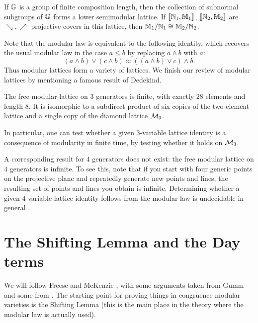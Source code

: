 \begin{appendices}
\begin{prop} If $\mathbb{G}$ is a group of finite composition length, then the collection of subnormal subgroups of $\mathbb{G}$ forms a lower semimodular lattice. If $\llbracket \mathbb{N}_1, \mathbb{M}_1 \rrbracket$, $\llbracket \mathbb{N}_2, \mathbb{M}_2 \rrbracket$ are $\searrow, \nearrow$ projective covers in this lattice, then $\mathbb{M}_1/\mathbb{N}_1 \cong \mathbb{M}_2/\mathbb{N}_2$.
\end{prop}

Note that the modular law is equivalent to the following identity, which recovers the usual modular law in the case $a \le b$ by replacing $a \wedge b$ with $a$:
\[
(a \wedge b) \vee (c \wedge b) \approx ((a \wedge b) \vee c) \wedge b.
\]
Thus modular lattices form a variety of lattices. We finish our review of modular lattices by mentioning a famous result of Dedekind.

\begin{prop} The free modular lattice on $3$ generators is finite, with exactly $28$ elements and length $8$. It is isomorphic to a subdirect product of six copies of the two-element lattice and a single copy of the diamond lattice $\mathcal{M}_3$.

In particular, one can test whether a given $3$-variable lattice identity is a consequence of modularity in finite time, by testing whether it holds on $\mathcal{M}_3$.
\end{prop}

A corresponding result for $4$ generators does not exist: the free modular lattice on $4$ generators is infinite. To see this, note that if you start with four generic points on the projective plane and repeatedly generate new points and lines, the resulting set of points and lines you obtain is infinite. Determining whether a given $4$-variable lattice identity follows from the modular law is undecidable in general \cite{free-modular-undecidable}.


\section{The Shifting Lemma and the Day terms}\label{s-shifting}

We will follow Freese and McKenzie \cite{commutator-theory}, with some arguments taken from Gumm \cite{gumm-geometric} and some from \cite{commutator-notes}. The starting point for proving things in congruence modular varieties is the Shifting Lemma (this is the main place in the theory where the modular law is actually used).


\end{appendices}
